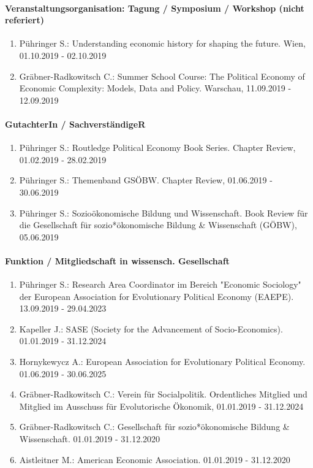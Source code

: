 \paragraph{Veranstaltungsorganisation: Tagung / Symposium / Workshop (nicht referiert)} 
\begin{enumerate}[leftmargin=*, labelsep=0.5cm] 
 	 \item Pühringer S.: Understanding economic history for shaping the future. Wien, 01.10.2019 - 02.10.2019 
	 \item Gräbner-Radkowitsch C.: Summer School Course: The Political Economy of Economic Complexity: Models, Data and Policy. Warschau, 11.09.2019 - 12.09.2019 
\end{enumerate} 
\paragraph{GutachterIn / SachverständigeR} 
\begin{enumerate}[leftmargin=*, labelsep=0.5cm] 
 	 \item Pühringer S.: Routledge Political Economy Book Series. Chapter Review, 01.02.2019 - 28.02.2019 
	 \item Pühringer S.: Themenband GSÖBW. Chapter Review, 01.06.2019 - 30.06.2019 
	 \item Pühringer S.: Sozioökonomische Bildung und Wissenschaft. Book Review für die Gesellschaft für sozio*ökonomische Bildung & Wissenschaft (GÖBW), 05.06.2019 
\end{enumerate} 
\paragraph{Funktion / Mitgliedschaft in wissensch. Gesellschaft} 
\begin{enumerate}[leftmargin=*, labelsep=0.5cm] 
 	 \item Pühringer S.: Research Area Coordinator im Bereich "Economic Sociology" der European Association for Evolutionary Political Economy (EAEPE). 13.09.2019 - 29.04.2023 
	 \item Kapeller J.: SASE (Society for the Advancement of Socio-Economics). 01.01.2019 - 31.12.2024 
	 \item Hornykewycz A.: European Association for Evolutionary Political Economy. 01.06.2019 - 30.06.2025 
	 \item Gräbner-Radkowitsch C.: Verein für Socialpolitik. Ordentliches Mitglied und Mitglied im Ausschuss für Evolutorische Ökonomik, 01.01.2019 - 31.12.2024 
	 \item Gräbner-Radkowitsch C.: Gesellschaft für sozio*ökonomische Bildung & Wissenschaft. 01.01.2019 - 31.12.2020 
	 \item Aistleitner M.: American Economic Association. 01.01.2019 - 31.12.2020 
\end{enumerate} 

